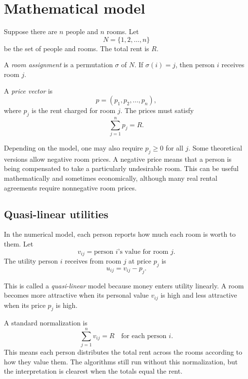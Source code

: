 \documentclass[11pt]{article}
\begin{document}
\section{Mathematical model}

Suppose there are $n$ people and $n$ rooms. Let
\[
    N=\{1,2,\dots,n\}
\]
be the set of people and rooms. The total rent is $R$.

A \emph{room assignment} is a permutation $\sigma$ of $N$. If $\sigma(i)=j$, then person $i$ receives room $j$.

A \emph{price vector} is
\[
    p=(p_1,p_2,\dots,p_n),
\]
where $p_j$ is the rent charged for room $j$. The prices must satisfy
\begin{equation}
    \sum_{j=1}^{n} p_j=R.
    \label{eq:pricesum}
\end{equation}

Depending on the model, one may also require $p_j\geq 0$ for all $j$. Some theoretical versions allow negative room prices. A negative price means that a person is being compensated to take a particularly undesirable room. This can be useful mathematically and sometimes economically, although many real rental agreements require nonnegative room prices.

\subsection{Quasi-linear utilities}

In the numerical model, each person reports how much each room is worth to them. Let
\[
    v_{ij}=\text{person } i\text{'s value for room }j.
\]
The utility person $i$ receives from room $j$ at price $p_j$ is
\begin{equation}
    u_{ij}=v_{ij}-p_j.
    \label{eq:utility}
\end{equation}

This is called a \emph{quasi-linear} model because money enters utility linearly. A room becomes more attractive when its personal value $v_{ij}$ is high and less attractive when its price $p_j$ is high.

A standard normalization is
\begin{equation}
    \sum_{j=1}^{n}v_{ij}=R \quad \text{for each person } i.
    \label{eq:normalization}
\end{equation}
This means each person distributes the total rent across the rooms according to how they value them. The algorithms still run without this normalization, but the interpretation is clearest when the totals equal the rent.
\end{document}
